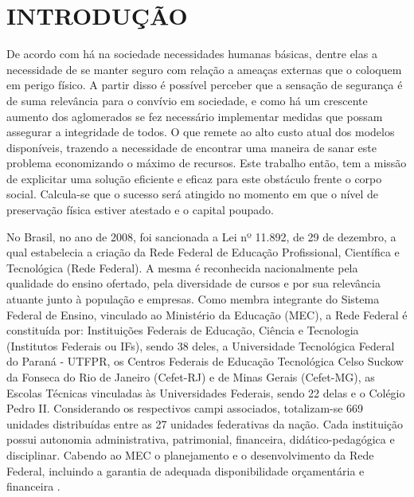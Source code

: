 \chapter{INTRODUÇÃO}
\label{cap:introducao}

De acordo com  há na sociedade necessidades humanas básicas,
dentre elas a necessidade de se manter seguro com relação a ameaças externas
que o coloquem em perigo físico. A partir disso é possível perceber que a sensação
de segurança é de suma relevância para o convívio em sociedade, e como há um crescente
aumento dos aglomerados se fez necessário implementar medidas que possam assegurar a
integridade de todos. O que remete ao alto custo atual dos modelos disponíveis, trazendo a necessidade
de encontrar uma maneira de sanar este problema economizando o máximo de recursos. Este trabalho então, tem a missão de explicitar uma solução eficiente e eficaz para este obstáculo frente o corpo social. Calcula-se que o sucesso será atingido no momento em que
o nível de preservação física estiver atestado e o capital poupado.



No Brasil, no ano de 2008, foi sancionada a Lei nº 11.892, de 29 de dezembro, a qual estabelecia a criação da Rede Federal de Educação Profissional, Científica e Tecnológica (Rede Federal). A mesma é reconhecida nacionalmente pela qualidade do ensino ofertado, pela diversidade de cursos e por sua relevância atuante junto à população e empresas. Como membra integrante do Sistema Federal de Ensino, vinculado ao Ministério da Educação (MEC), a Rede Federal é constituída por: Instituições Federais de Educação, Ciência e Tecnologia (Institutos Federais ou IFs), sendo 38 deles, a Universidade Tecnológica Federal do Paraná - UTFPR, os Centros Federais de Educação Tecnológica Celso Suckow da Fonseca do Rio de Janeiro (Cefet-RJ) e de Minas Gerais (Cefet-MG), as Escolas Técnicas vinculadas às Universidades Federais, sendo 22 delas e o Colégio Pedro II. Considerando os respectivos campi associados, totalizam-se 669 unidades distribuídas entre as 27 unidades federativas da nação. Cada instituição possui autonomia administrativa,  patrimonial, financeira, didático-pedagógica e disciplinar. Cabendo ao MEC o planejamento e o desenvolvimento da Rede Federal, incluindo a garantia de adequada disponibilidade orçamentária e financeira \cite{redefederal}.



